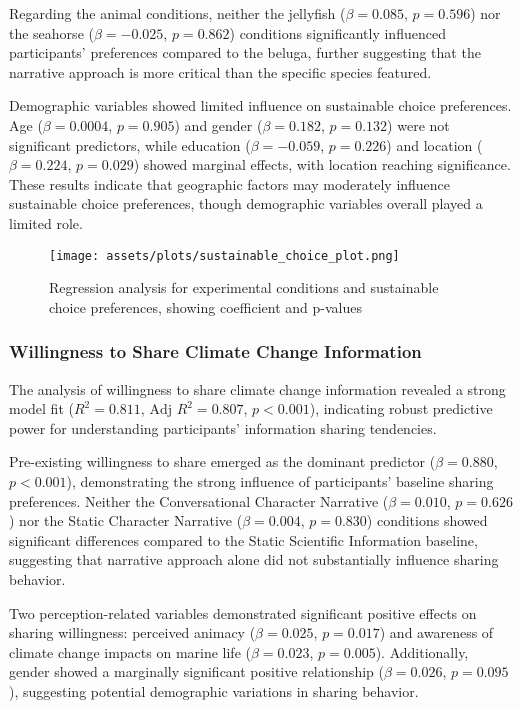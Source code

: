 \documentclass[sigconf, nonacm]{acmart}
\begin{document}
Regarding the animal conditions, neither the jellyfish ($\beta = 0.085$, $p = 0.596$) nor the seahorse ($\beta = -0.025$, $p = 0.862$) conditions significantly influenced participants' preferences compared to the beluga, further suggesting that the narrative approach is more critical than the specific species featured.

Demographic variables showed limited influence on sustainable choice preferences. Age ($\beta = 0.0004$, $p = 0.905$) and gender ($\beta = 0.182$, $p = 0.132$) were not significant predictors, while education ($\beta = -0.059$, $p = 0.226$) and location ($\beta = 0.224$, $p = 0.029$) showed marginal effects, with location reaching significance. These results indicate that geographic factors may moderately influence sustainable choice preferences, though demographic variables overall played a limited role.

\begin{figure}
    \centering
    \texttt{[image: assets/plots/sustainable\_choice\_plot.png]}
    \caption{Regression analysis for experimental conditions and sustainable choice preferences, showing coefficient and p-values}
    \label{fig:choices_post}
\end{figure}
\subsubsection{Willingness to Share Climate Change Information}

The analysis of willingness to share climate change information revealed a strong model fit ($R^2 = 0.811$, $\text{Adj } R^2 = 0.807$, $p < 0.001$), indicating robust predictive power for understanding participants' information sharing tendencies.

Pre-existing willingness to share emerged as the dominant predictor ($\beta = 0.880$, $p < 0.001$), demonstrating the strong influence of participants' baseline sharing preferences. Neither the Conversational Character Narrative ($\beta = 0.010$, $p = 0.626$) nor the Static Character Narrative ($\beta = 0.004$, $p = 0.830$) conditions showed significant differences compared to the Static Scientific Information baseline, suggesting that narrative approach alone did not substantially influence sharing behavior.

Two perception-related variables demonstrated significant positive effects on sharing willingness: perceived animacy ($\beta = 0.025$, $p = 0.017$) and awareness of climate change impacts on marine life ($\beta = 0.023$, $p = 0.005$). Additionally, gender showed a marginally significant positive relationship ($\beta = 0.026$, $p = 0.095$), suggesting potential demographic variations in sharing behavior.
\end{document}
